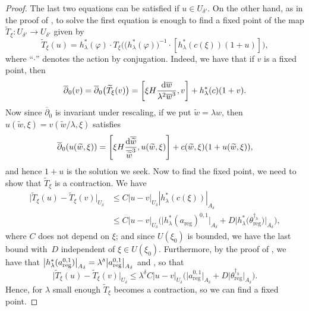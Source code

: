 \begin{proof}
The last two equations can be satisfied if $u\in U_{\delta'}$. On the other hand, as in the proof of \cite[Lemma 7.1]{BB04}, to solve the first equation is enough to find a fixed point of the map $\widetilde{T}_{\xi}\colon U_{\delta'}\to U_{\delta'}$ given by
\begin{equation*}
 \widetilde{T}_{\xi}(u)=h^{*}_{\lambda}(\varphi)\cdot T_{\xi}\big(\big(h^{*}_{\lambda}(\varphi)\big)^{-1}\cdot[ h^{*}_{\lambda}(c(\xi))(1+u)]\big),
\end{equation*}
where ``$\cdot$'' denotes the action by conjugation. Indeed, we have that if $v$ is a fixed point, then
\begin{equation*}
 \begin{split}
 \overline{\partial}_0(v)=\overline{\partial}_0\bigl(\widetilde{T}_{\xi}(v)\bigr)=\left[\xi H \frac{{\rm d}\overline{w}}{\lambda^2\overline{w}^3},v\right]+h^*_{\lambda}(c)(1+v).
 \end{split}
\end{equation*}
Now since $\overline{\partial}_0$ is invariant under rescaling, if we put $\widetilde{w}=\lambda w$, then $u(\widetilde{w},\xi)=v(\widetilde{w}/\lambda,\xi)$ satisfies
\begin{equation*}
 \overline{\partial}_0(u(\widetilde{w},\xi))=\left[\xi H \frac{{\rm d}\overline{\widetilde{w}}}{\overline{\widetilde{w}}^3},u(\widetilde{w},\xi)\right]+c(\widetilde{w},\xi)(1+u(\widetilde{w},\xi)),
\end{equation*}
and hence $1+u$ is the solution we seek. Now to find the fixed point, we need to show that $\widetilde{T}_{\xi}$ is a contraction. We have
\begin{align*}
 \big|\widetilde{T}_{\xi}(u)-\widetilde{T}_{\xi}(v)\big|_{U_{\delta}}&\leq C|u-v|_{U_{\delta}}|h^*_{\lambda}(c(\xi))|_{A_{\delta}}\\
 &\leq C|u-v|_{U_{\delta}}\bigl(\big|h^*_{\lambda}(a_{\text{reg}})^{0,1}\big|_{A_{\delta}}+D\big|h^*_{\lambda}\bigl(\theta_{\text{reg}}^{\dagger_h}\bigr)\big|_{A_{\delta}}\bigr),
\end{align*}
where $C$ does not depend on $\xi$; and since $U(\xi_0)$ is bounded, we have the last bound with~$D$ independent of $\xi \in U(\xi_0)$. Furthermore, by the proof of \cite[Lemma 7.1]{BB04}, we have that $\smash{\big|h^*_{\lambda}(a_{\text{reg}}^{0,1})\big|_{A_{\delta}}}=\smash{\lambda^{\delta}\big|a_{\text{reg}}^{0,1}\big|_{A_{\delta}}}$ and , so that
\begin{equation*}
 \big|\widetilde{T}_{\xi}(u)-\widetilde{T}_{\xi}(v)\big|_{U_{\delta}}\leq \lambda^{\delta}C|u-v|_{U_{\delta}}\bigl(\big|a_{\text{reg}}^{0,1}\big|_{A_{\delta}}+D\big|\theta_{\text{reg}}^{\dagger_h}\big|_{A_{\delta}}\bigr).
\end{equation*}
Hence, for $\lambda$ small enough $\widetilde{T}_{\xi}$ becomes a contraction, so we can find a fixed point.


\end{proof}
